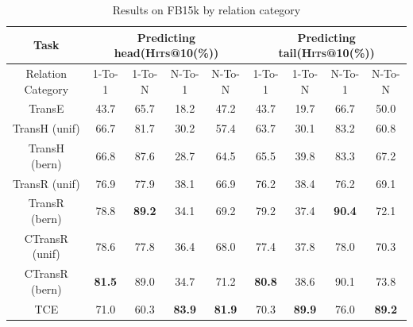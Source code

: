 \begin{table} %
  \centering
  \caption{Results on FB15k by relation category}
  \label{table_results_by_relation_category}
  \begin{tabular}{c|cccc|cccc}
    \hline
    Task               & \multicolumn{4}{c|}{Predicting head(\textsc{Hits}@10(\%))} & \multicolumn{4}{c}{Predicting tail(\textsc{Hits}@10(\%))} \\
    \hline
    Relation Category  & 1-To-1        & 1-To-N        & N-To-1        & N-To-N        & 1-To-1        & 1-To-N        & N-To-1        & N-To-N \\
    \hline
    TransE             & 43.7          & 65.7          & 18.2          & 47.2          & 43.7          & 19.7          & 66.7          & 50.0   \\
    TransH (unif)      & 66.7          & 81.7          & 30.2          & 57.4          & 63.7          & 30.1          & 83.2          & 60.8   \\
    TransH (bern)      & 66.8          & 87.6          & 28.7          & 64.5          & 65.5          & 39.8          & 83.3          & 67.2   \\
    TransR (unif)      & 76.9          & 77.9          & 38.1          & 66.9          & 76.2          & 38.4          & 76.2          & 69.1   \\
    TransR (bern)      & 78.8          & \textbf{89.2} & 34.1          & 69.2          & 79.2          & 37.4          & \textbf{90.4} & 72.1   \\
    CTransR (unif)     & 78.6          & 77.8          & 36.4          & 68.0          & 77.4          & 37.8          & 78.0          & 70.3   \\
    CTransR (bern)     & \textbf{81.5} & 89.0          & 34.7          & 71.2          & \textbf{80.8} & 38.6          & 90.1          & 73.8   \\
    \hline
    TCE                & 71.0          & 60.3          & \textbf{83.9} & \textbf{81.9} & 70.3          & \textbf{89.9} & 76.0          & \textbf{89.2}   \\
    \hline
\end{tabular}
\end{table}
